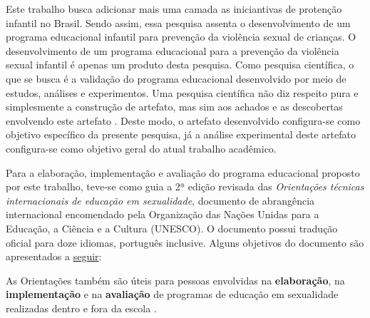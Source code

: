 Este trabalho busca adicionar mais uma camada as iniciantivas de protenção infantil no Brasil. Sendo assim, essa pesquisa assenta o desenvolvimento de um programa educacional infantil para prevenção da violência sexual de crianças. O desenvolvimento de um programa educacional para a prevenção da violência sexual infantil é apenas um produto desta pesquisa. Como pesquisa científica, o que se busca é a validação do programa educacional desenvolvido por meio de estudos, análises e experimentos. Uma pesquisa científica não diz respeito pura e simplesmente a construção de artefato, mas sim aos achados e as descobertas envolvendo este artefato \cite{wazlawick2014metodologia}. Deste modo, o artefato desenvolvido configura-se como objetivo específico da presente pesquisa, já a análise experimental deste artefato configura-se como objetivo geral do atual trabalho acadêmico. 

Para a elaboração, implementação e avaliação do programa educacional proposto por este trabalho, teve-se como guia a 2ª edição revisada das \textit{Orientações técnicas internacionais de educação em sexualidade}, documento de abrangência internacional encomendado pela Organização das Nações Unidas para a Educação, a Ciência e a Cultura (UNESCO). O documento possui tradução oficial para doze idiomas, português inclusive. Alguns objetivos do documento são apresentados a \hyperref[UNESCO]{seguir}:

\begin{citacao}\label{UNESCO}
  As Orientações também são úteis para pessoas envolvidas na \textbf{elaboração}, na \textbf{implementação} e na \textbf{avaliação} de programas de educação em sexualidade realizadas dentro e fora da escola \cite[p. 12, grifo meu]{women2018international}.%
\end{citacao}

